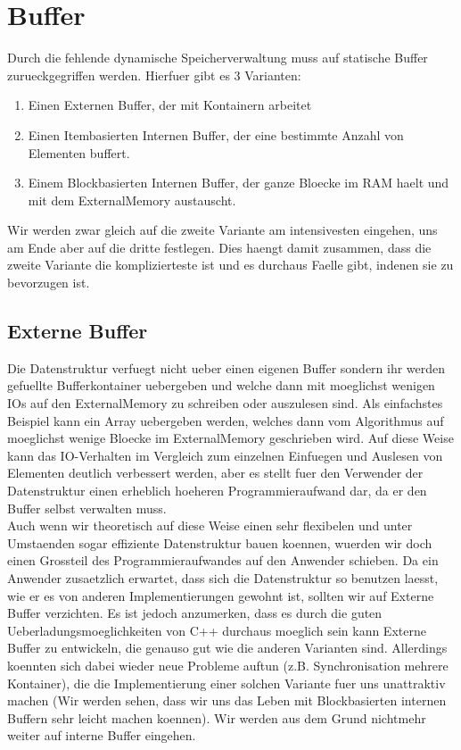 \documentclass[10pt,a4paper]{article}
\begin{document}
\section{Buffer}
Durch die fehlende dynamische Speicherverwaltung muss auf statische Buffer zurueckgegriffen werden. Hierfuer gibt es 3 Varianten:
\begin{enumerate}
\item Einen Externen Buffer, der mit Kontainern arbeitet
\item Einen Itembasierten Internen Buffer, der eine bestimmte Anzahl von Elementen buffert.
\item Einem Blockbasierten  Internen Buffer, der ganze Bloecke im RAM haelt und mit dem ExternalMemory austauscht.
\end{enumerate}
Wir werden zwar gleich auf die zweite Variante am intensivesten eingehen, uns am Ende aber auf die dritte festlegen. Dies haengt damit zusammen, dass die zweite Variante die komplizierteste ist und es durchaus Faelle gibt, indenen sie zu bevorzugen ist. 
\subsection{Externe Buffer}
Die Datenstruktur verfuegt nicht ueber einen eigenen Buffer sondern ihr werden gefuellte Bufferkontainer uebergeben und welche dann mit moeglichst wenigen IOs auf den ExternalMemory zu schreiben oder auszulesen sind. Als einfachstes Beispiel kann ein Array uebergeben werden, welches dann vom Algorithmus auf moeglichst wenige Bloecke im ExternalMemory geschrieben wird. Auf diese Weise kann das IO-Verhalten im Vergleich zum einzelnen Einfuegen und Auslesen von Elementen deutlich verbessert werden, aber es stellt fuer den Verwender der Datenstruktur einen erheblich hoeheren Programmieraufwand dar, da er den Buffer selbst verwalten muss.\\
Auch wenn wir theoretisch auf diese Weise einen sehr flexibelen und unter Umstaenden sogar effiziente Datenstruktur bauen koennen, wuerden wir doch einen Grossteil des Programmieraufwandes auf den Anwender schieben. Da ein Anwender zusaetzlich erwartet, dass sich die Datenstruktur so benutzen laesst, wie er es von anderen Implementierungen gewohnt ist, sollten wir auf Externe Buffer verzichten. Es ist jedoch anzumerken, dass es durch die guten Ueberladungsmoeglichkeiten von C++ durchaus moeglich sein kann Externe Buffer zu entwickeln, die genauso gut wie die anderen Varianten sind. Allerdings koennten sich dabei wieder neue Probleme auftun (z.B. Synchronisation mehrere Kontainer), die die Implementierung einer solchen Variante fuer uns unattraktiv machen (Wir werden sehen, dass wir uns das Leben mit Blockbasierten internen Buffern sehr leicht machen koennen). Wir werden aus dem Grund nichtmehr weiter auf interne Buffer eingehen.
\end{document}
